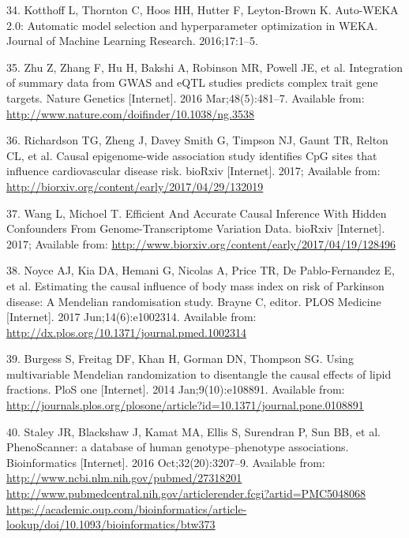 \documentclass[]{article}
\begin{document}
\hypertarget{ref-kotthoff2016auto}{}
34. Kotthoff L, Thornton C, Hoos HH, Hutter F, Leyton-Brown K. Auto-WEKA
2.0: Automatic model selection and hyperparameter optimization in WEKA.
Journal of Machine Learning Research. 2016;17:1--5.

\hypertarget{ref-Zhu2016}{}
35. Zhu Z, Zhang F, Hu H, Bakshi A, Robinson MR, Powell JE, et al.
Integration of summary data from GWAS and eQTL studies predicts complex
trait gene targets. Nature Genetics {[}Internet{]}. 2016
Mar;48(5):481--7. Available from:
\url{http://www.nature.com/doifinder/10.1038/ng.3538}

\hypertarget{ref-Richardson2017}{}
36. Richardson TG, Zheng J, Davey Smith G, Timpson NJ, Gaunt TR, Relton
CL, et al. Causal epigenome-wide association study identifies CpG sites
that influence cardiovascular disease risk. bioRxiv {[}Internet{]}.
2017; Available from:
\url{http://biorxiv.org/content/early/2017/04/29/132019}

\hypertarget{ref-Wang2017}{}
37. Wang L, Michoel T. Efficient And Accurate Causal Inference With
Hidden Confounders From Genome-Transcriptome Variation Data. bioRxiv
{[}Internet{]}. 2017; Available from:
\url{http://www.biorxiv.org/content/early/2017/04/19/128496}

\hypertarget{ref-Noyce2017}{}
38. Noyce AJ, Kia DA, Hemani G, Nicolas A, Price TR, De Pablo-Fernandez
E, et al. Estimating the causal influence of body mass index on risk of
Parkinson disease: A Mendelian randomisation study. Brayne C, editor.
PLOS Medicine {[}Internet{]}. 2017 Jun;14(6):e1002314. Available from:
\url{http://dx.plos.org/10.1371/journal.pmed.1002314}

\hypertarget{ref-Burgess2014a}{}
39. Burgess S, Freitag DF, Khan H, Gorman DN, Thompson SG. Using
multivariable Mendelian randomization to disentangle the causal effects
of lipid fractions. PloS one {[}Internet{]}. 2014 Jan;9(10):e108891.
Available from:
\url{http://journals.plos.org/plosone/article?id=10.1371/journal.pone.0108891}

\hypertarget{ref-Staley2016}{}
40. Staley JR, Blackshaw J, Kamat MA, Ellis S, Surendran P, Sun BB, et
al. PhenoScanner: a database of human genotype--phenotype associations.
Bioinformatics {[}Internet{]}. 2016 Oct;32(20):3207--9. Available from:
\href{http://www.ncbi.nlm.nih.gov/pubmed/27318201\%20http://www.pubmedcentral.nih.gov/articlerender.fcgi?artid=PMC5048068\%20https://academic.oup.com/bioinformatics/article-lookup/doi/10.1093/bioinformatics/btw373}{http://www.ncbi.nlm.nih.gov/pubmed/27318201 http://www.pubmedcentral.nih.gov/articlerender.fcgi?artid=PMC5048068 https://academic.oup.com/bioinformatics/article-lookup/doi/10.1093/bioinformatics/btw373}
\end{document}

